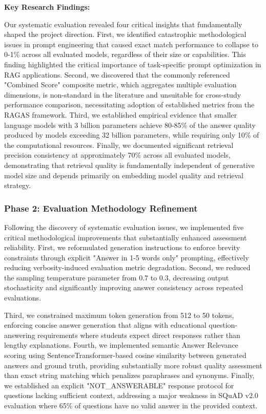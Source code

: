 \documentclass[12pt,a4paper]{article}
\begin{document}
\textbf{Key Research Findings:}

Our systematic evaluation revealed four critical insights that fundamentally shaped the project direction. First, we identified catastrophic methodological issues in prompt engineering that caused exact match performance to collapse to 0-1\% across all evaluated models, regardless of their size or capabilities. This finding highlighted the critical importance of task-specific prompt optimization in RAG applications. Second, we discovered that the commonly referenced "Combined Score" composite metric, which aggregates multiple evaluation dimensions, is non-standard in the literature and unsuitable for cross-study performance comparison, necessitating adoption of established metrics from the RAGAS framework. Third, we established empirical evidence that smaller language models with 3 billion parameters achieve 80-85\% of the answer quality produced by models exceeding 32 billion parameters, while requiring only 10\% of the computational resources. Finally, we documented significant retrieval precision consistency at approximately 70\% across all evaluated models, demonstrating that retrieval quality is fundamentally independent of generative model size and depends primarily on embedding model quality and retrieval strategy.

\subsubsection{Phase 2: Evaluation Methodology Refinement}

Following the discovery of systematic evaluation issues, we implemented five critical methodological improvements that substantially enhanced assessment reliability. First, we reformulated generation instructions to enforce brevity constraints through explicit "Answer in 1-5 words only" prompting, effectively reducing verbosity-induced evaluation metric degradation. Second, we reduced the sampling temperature parameter from 0.7 to 0.3, decreasing output stochasticity and significantly improving answer consistency across repeated evaluations.

Third, we constrained maximum token generation from 512 to 50 tokens, enforcing concise answer generation that aligns with educational question-answering requirements where students expect direct responses rather than lengthy explanations. Fourth, we implemented semantic Answer Relevance scoring using SentenceTransformer-based cosine similarity between generated answers and ground truth, providing substantially more robust quality assessment than exact string matching which penalizes paraphrases and synonyms. Finally, we established an explicit "NOT\_ANSWERABLE" response protocol for questions lacking sufficient context, addressing a major weakness in SQuAD v2.0 evaluation where 65\% of questions have no valid answer in the provided context.
\end{document}
